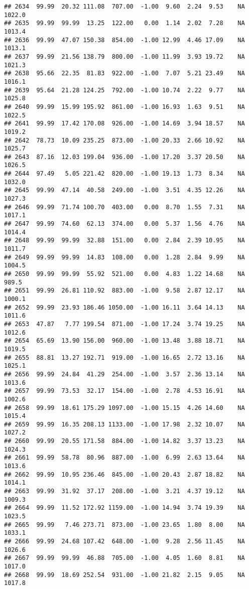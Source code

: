 \documentclass{article}\usepackage{graphicx, color}
\makeatletter
\newenvironment{kframe}{%
 \def\at@end@of@kframe{}%
 \ifinner\ifhmode%
  \def\at@end@of@kframe{\end{minipage}}%
  \begin{minipage}{\columnwidth}%
 \fi\fi%
 \def\FrameCommand##1{\hskip\@totalleftmargin \hskip-\fboxsep
 \colorbox{shadecolor}{##1}\hskip-\fboxsep
     \hskip-\linewidth \hskip-\@totalleftmargin \hskip\columnwidth}%
 \MakeFramed {\advance\hsize-\width
   \@totalleftmargin\z@ \linewidth\hsize
   \@setminipage}}%
 {\par\unskip\endMakeFramed%
 \at@end@of@kframe}
\newenvironment{knitrout}{}{} %
\makeatother
\begin{document}
\begin{knitrout}
\begin{kframe}
\begin{verbatim}
## 2634  99.99  20.32 111.08  707.00  -1.00  9.60  2.24  9.53    NA 1022.0
## 2635  99.99  99.99  13.25  122.00   0.00  1.14  2.02  7.28    NA 1013.4
## 2636  99.99  47.07 150.38  854.00  -1.00 12.99  4.46 17.09    NA 1013.1
## 2637  99.99  21.56 138.79  800.00  -1.00 11.99  3.93 19.72    NA 1021.3
## 2638  95.66  22.35  81.83  922.00  -1.00  7.07  5.21 23.49    NA 1016.1
## 2639  95.64  21.28 124.25  792.00  -1.00 10.74  2.22  9.77    NA 1025.8
## 2640  99.99  15.99 195.92  861.00  -1.00 16.93  1.63  9.51    NA 1022.5
## 2641  99.99  17.42 170.08  926.00  -1.00 14.69  3.94 18.57    NA 1019.2
## 2642  78.73  10.09 235.25  873.00  -1.00 20.33  2.66 10.92    NA 1025.7
## 2643  87.16  12.03 199.04  936.00  -1.00 17.20  3.37 20.50    NA 1026.5
## 2644  97.49   5.05 221.42  820.00  -1.00 19.13  1.73  8.34    NA 1032.0
## 2645  99.99  47.14  40.58  249.00  -1.00  3.51  4.35 12.26    NA 1027.3
## 2646  99.99  71.74 100.70  403.00   0.00  8.70  1.55  7.31    NA 1017.1
## 2647  99.99  74.60  62.13  374.00   0.00  5.37  1.56  4.76    NA 1014.4
## 2648  99.99  99.99  32.88  151.00   0.00  2.84  2.39 10.95    NA 1011.7
## 2649  99.99  99.99  14.83  108.00   0.00  1.28  2.84  9.99    NA 1004.5
## 2650  99.99  99.99  55.92  521.00   0.00  4.83  1.22 14.68    NA  989.5
## 2651  99.99  26.81 110.92  883.00  -1.00  9.58  2.87 12.17    NA 1000.1
## 2652  99.99  23.93 186.46 1050.00  -1.00 16.11  3.64 14.13    NA 1011.6
## 2653  47.87   7.77 199.54  871.00  -1.00 17.24  3.74 19.25    NA 1012.6
## 2654  65.69  13.90 156.00  960.00  -1.00 13.48  3.88 18.71    NA 1019.5
## 2655  88.81  13.27 192.71  919.00  -1.00 16.65  2.72 13.16    NA 1025.1
## 2656  99.99  24.84  41.29  254.00  -1.00  3.57  2.36 13.14    NA 1013.6
## 2657  99.99  73.53  32.17  154.00  -1.00  2.78  4.53 16.91    NA 1002.6
## 2658  99.99  18.61 175.29 1097.00  -1.00 15.15  4.26 14.60    NA 1015.4
## 2659  99.99  16.35 208.13 1133.00  -1.00 17.98  2.32 10.07    NA 1027.2
## 2660  99.99  20.55 171.58  884.00  -1.00 14.82  3.37 13.23    NA 1024.3
## 2661  99.99  58.78  80.96  887.00  -1.00  6.99  2.63 13.64    NA 1013.6
## 2662  99.99  10.95 236.46  845.00  -1.00 20.43  2.87 18.82    NA 1014.1
## 2663  99.99  31.92  37.17  208.00  -1.00  3.21  4.37 19.12    NA 1009.3
## 2664  99.99  11.52 172.92 1159.00  -1.00 14.94  3.74 19.39    NA 1023.5
## 2665  99.99   7.46 273.71  873.00  -1.00 23.65  1.80  8.00    NA 1033.1
## 2666  99.99  24.68 107.42  648.00  -1.00  9.28  2.56 11.45    NA 1026.6
## 2667  99.99  99.99  46.88  705.00  -1.00  4.05  1.60  8.81    NA 1017.0
## 2668  99.99  18.69 252.54  931.00  -1.00 21.82  2.15  9.05    NA 1017.8

\end{verbatim}
\end{kframe}
\end{knitrout}
\end{document}
